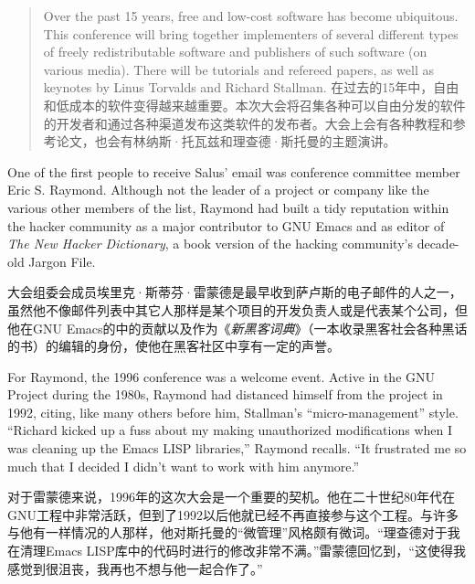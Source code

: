 \begin{quote}
\ifdefined\eng
Over the past 15 years, free and low-cost software has become ubiquitous. This conference will bring together implementers of several different types of freely redistributable software and publishers of such software (on various media). There will be tutorials and refereed papers, as well as keynotes by Linus Torvalds and Richard Stallman.
\fi
\ifdefined\chs
在过去的15年中，自由和低成本的软件变得越来越重要。本次大会将召集各种可以自由分发的软件的开发者和通过各种渠道发布这类软件的发布者。大会上会有各种教程和参考论文，也会有林纳斯·托瓦兹和理查德·斯托曼的主题演讲。
\fi
\end{quote}

\ifdefined\eng
One of the first people to receive Salus' email was conference committee member Eric S. Raymond. Although not the leader of a project or company like the various other members of the list, Raymond had built a tidy reputation within the hacker community as a major contributor to GNU Emacs and as editor of \textit{The New Hacker Dictionary}, a book version of the hacking community's decade-old Jargon File.
\fi

\ifdefined\chs
大会组委会成员埃里克·斯蒂芬·雷蒙德是最早收到萨卢斯的电子邮件的人之一，虽然他不像邮件列表中其它人那样是某个项目的开发负责人或是代表某个公司，但他在GNU Emacs的中的贡献以及作为《\textit{新黑客词典}》（一本收录黑客社会各种黑话的书）的编辑的身份，使他在黑客社区中享有一定的声誉。
\fi

\ifdefined\eng
For Raymond, the 1996 conference was a welcome event. Active in the GNU Project during the 1980s, Raymond had distanced himself from the project in 1992, citing, like many others before him, Stallman's ``micro-management'' style. ``Richard kicked up a fuss about my making unauthorized modifications when I was cleaning up the Emacs LISP libraries,'' Raymond recalls. ``It frustrated me so much that I decided I didn't want to work with him anymore.''
\fi

\ifdefined\chs
对于雷蒙德来说，1996年的这次大会是一个重要的契机。他在二十世纪80年代在GNU工程中非常活跃，但到了1992以后他就已经不再直接参与这个工程。与许多与他有一样情况的人那样，他对斯托曼的“微管理”风格颇有微词。“理查德对于我在清理Emacs LISP库中的代码时进行的修改非常不满。”雷蒙德回忆到，“这使得我感觉到很沮丧，我再也不想与他一起合作了。”
\fi

